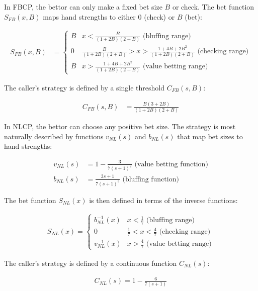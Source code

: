 \documentclass[a4paper,12pt]{article}
\theoremstyle{plain}
\theoremstyle{definition}
\begin{document}
In FBCP, the bettor can only make a fixed bet size $B$ or check. The bet function $S_{FB}(x, B)$ maps hand strengths to either $0$ (check) or $B$ (bet):

\begin{align}
	S_{FB}(x, B) & = \begin{cases}
    B & x < \frac{B}{(1+2B)(2+B)} \text{ (bluffing range)}\\
    0 & \frac{B}{(1+2B)(2+B)} > x > \frac{1 + 4B + 2B^2}{(1+2B)(2+B)} \text{ (checking range)}\\
    B & x > \frac{1 + 4B + 2B^2}{(1+2B)(2+B)} \text{ (value betting range)}
\end{cases}
\end{align}

The caller's strategy is defined by a single threshold $C_{FB}(s, B)$:

\begin{align}
C_{FB}(s, B) & = \frac{B(3 +2B)}{(1+2B)(2+B)}
\end{align}

In NLCP, the bettor can choose any positive bet size. The strategy is most naturally described by functions $v_{NL}(s)$ and $b_{NL}(s)$ that map bet sizes to hand strengths:

\begin{align*}
    v_{NL}(s) &= 1 - \frac{3}{7(s+1)^2} \text{ (value betting function)} \\
    b_{NL}(s) &= \frac{3s+1}{7(s+1)^3} \text{ (bluffing function)}
\end{align*}

The bet function $S_{NL}(x)$ is then defined in terms of the inverse functions:

\begin{align*}
    S_{NL}(x) = \begin{cases}
        b_{NL}^{-1}(x) & x < \frac{1}{7} \text{ (bluffing range)} \\
        0 & \frac{1}{7} < x < \frac{4}{7} \text{ (checking range)} \\
        v_{NL}^{-1}(x) & x > \frac{4}{7} \text{ (value betting range)}
    \end{cases}
\end{align*}

The caller's strategy is defined by a continuous function $C_{NL}(s)$:

\begin{align*}
    C_{NL}(s) = 1 - \frac{6}{7 (s+1)}
\end{align*}
\end{document}
